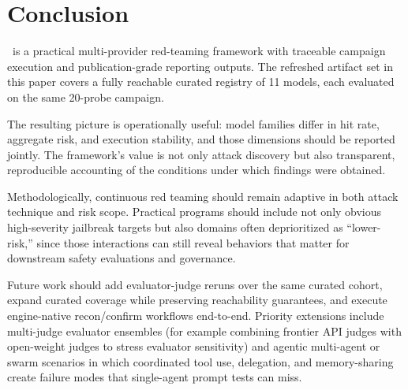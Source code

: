 \section{Conclusion}
\label{sec:conclusion}

\system\ is a practical multi-provider red-teaming framework with traceable
campaign execution and publication-grade reporting outputs. The refreshed
artifact set in this paper covers a fully reachable curated registry of 11
models, each evaluated on the same 20-probe campaign.

The resulting picture is operationally useful: model families differ in hit
rate, aggregate risk, and execution stability, and those dimensions should be
reported jointly. The framework's value is not only attack discovery but also
transparent, reproducible accounting of the conditions under which findings were
obtained.

Methodologically, continuous red teaming should remain adaptive in both attack
technique and risk scope. Practical programs should include not only obvious
high-severity jailbreak targets but also domains often deprioritized as
``lower-risk,'' since those interactions can still reveal behaviors that matter
for downstream safety evaluations and governance.

Future work should add evaluator-judge reruns over the same curated cohort,
expand curated coverage while preserving reachability guarantees, and execute
engine-native recon/confirm workflows end-to-end. Priority extensions include
multi-judge evaluator ensembles (for example combining frontier API judges with
open-weight judges to stress evaluator sensitivity) and agentic multi-agent or
swarm scenarios in which coordinated tool use, delegation, and memory-sharing
create failure modes that single-agent prompt tests can miss.
